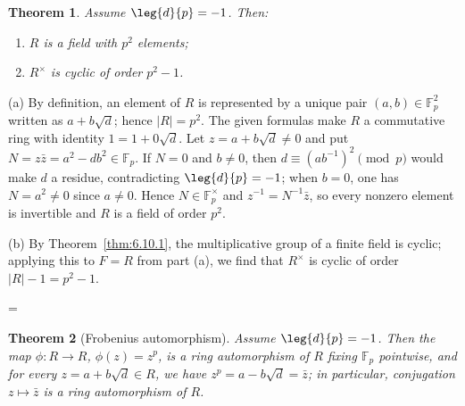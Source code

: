 \documentclass[11pt]{article}
\makeatletter
\theoremstyle{ntstyle}
\newtheorem{theorem}{Theorem}[subsection]
\let\nt@closedisplay\]
\def\nt@guardedclose{\@ifnextchar\par{\nt@closeafterpar}{\@ifnextchar\end{\postdisplaypenalty\@M\nt@closedisplay}{\nt@closedisplay}}}
\def\nt@closeafterpar\par{\@ifnextchar\par{\nt@closeafterpar}{\@ifnextchar\end{\postdisplaypenalty\@M\nt@closedisplay\par}{\nt@closedisplay\par}}}
\renewenvironment{proof}[1][\proofname]{\par
  \pushQED{\qed}\normalfont\topsep\medskipamount\edef\nt@afterproof{\@endparpenalty=\the\@endparpenalty\relax}\@beginparpenalty\@M\@endparpenalty\@M\let\]\nt@guardedclose\trivlist\item[]\textit{#1\@addpunct{.}} \ignorespaces}{\ifvmode\addpenalty\@M\fi\popQED\nt@afterproof\endtrivlist\@endpefalse}
\makeatother
\begin{document}
\begin{theorem}\label{thm:7.9.1} Assume $\leg{d}{p}=-1$. Then:
	\begin{enumerate}[label={\alph*)}]
		\item $R$ is a field with $p^{2}$ elements;
		\item $R^{\times}$ is cyclic of order $p^{2}-1$.
	\end{enumerate}

\end{theorem}

\begin{proof} (a) By definition, an element of $R$ is represented by a
	unique pair $(a,b)\in\mathbb{F}_p^2$ written as $a+b\sqrt{d}$; hence
	$|R|=p^2$. The given formulas make $R$ a commutative ring with
	identity $1 = 1 + 0\sqrt{d}$. Let $z = a + b\sqrt{d} \neq 0$ and put
	$N = z\bar z = a^2 - d b^2 \in \mathbb{F}_p$. If $N = 0$ and $b
		\neq 0$, then $d \equiv (a b^{-1})^2 \pmod{p}$ would make $d$ a residue,
	contradicting $\leg{d}{p} = -1$; when $b = 0$, one has $N =
		a^2 \neq 0$ since $a \neq 0$. Hence $N \in \mathbb{F}_p^{\times}$ and
	$z^{-1} = N^{-1}\bar z$, so every nonzero element is invertible and
	$R$ is a field of order $p^2$.

	(b) By Theorem~\ref{thm:6.10.1}, the multiplicative group of a finite field
	is cyclic; applying this to $F=R$ from part (a), we find that $R^{\times}$ is cyclic of
	order $|R|-1=p^{2}-1$.

\end{proof}
\begin{theorem}[Frobenius automorphism]\label{thm:7.9.2} Assume
	$\leg{d}{p}=-1$. Then the map $\phi:R\to R$, $\phi(z)=z^{p}$, is a ring
	automorphism of $R$ fixing $\mathbb{F}_p$ pointwise, and for every
	$z = a + b\sqrt{d} \in R$, we have $z^p = a - b\sqrt{d} = \bar z$; in particular,
	conjugation $z\mapsto\bar z$ is a ring automorphism of $R$.

\end{theorem}
\end{document}
